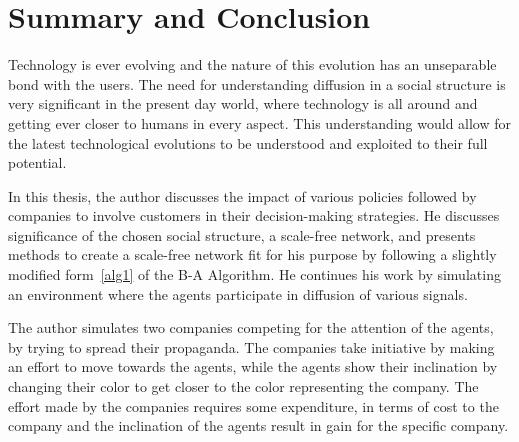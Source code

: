
\chapter{Summary and Conclusion} %

\label{Chapter7} %



Technology is ever evolving and the nature of this evolution has an unseparable bond with the users. The need for understanding diffusion in a social structure is very significant in the present day world, where technology is all around and getting ever closer to humans in every aspect. This understanding would allow for the latest technological evolutions to be understood and exploited to their full potential.

In this thesis, the author discusses the impact of various policies followed by companies to involve customers in their decision-making strategies. He discusses significance of the chosen social structure, a scale-free network, and presents methods to create a scale-free network fit for his purpose by following a slightly modified form~\ref{alg1} of the B-A Algorithm. He continues his work by simulating an environment where the agents participate in diffusion of various signals.

The author simulates two companies competing for the attention of the agents, by trying to spread their propaganda. The companies take initiative by making an effort to move towards the agents, while the agents show their inclination by changing their color to get closer to the color representing the company. The effort made by the companies requires some expenditure, in terms of cost to the company and the inclination of the agents result in gain for the specific company. 

